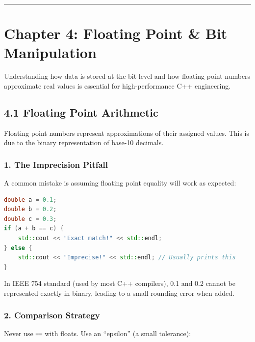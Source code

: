 \begin{center}\rule{0.5\linewidth}{0.5pt}\end{center}

\hypertarget{chapter-4-floating-point-bit-manipulation}{%
\chapter{Chapter 4: Floating Point \& Bit
Manipulation}\label{chapter-4-floating-point-bit-manipulation}}

Understanding how data is stored at the bit level and how floating-point
numbers approximate real values is essential for high-performance C++
engineering.

\hypertarget{floating-point-arithmetic}{%
\section{4.1 Floating Point
Arithmetic}\label{floating-point-arithmetic}}

Floating point numbers represent approximations of their assigned
values. This is due to the binary representation of base-10 decimals.

\hypertarget{the-imprecision-pitfall}{%
\subsection{1. The Imprecision Pitfall}\label{the-imprecision-pitfall}}

A common mistake is assuming floating point equality will work as
expected:

\begin{lstlisting}[language={C++}]
double a = 0.1;
double b = 0.2;
double c = 0.3;
if (a + b == c) {
    std::cout << "Exact match!" << std::endl;
} else {
    std::cout << "Imprecise!" << std::endl; // Usually prints this
}
\end{lstlisting}

In IEEE 754 standard (used by most C++ compilers), 0.1 and 0.2 cannot be
represented exactly in binary, leading to a small rounding error when
added.

\hypertarget{comparison-strategy}{%
\subsection{2. Comparison Strategy}\label{comparison-strategy}}

Never use \passthrough{\lstinline!==!} with floats. Use an ``epsilon''
(a small tolerance):


